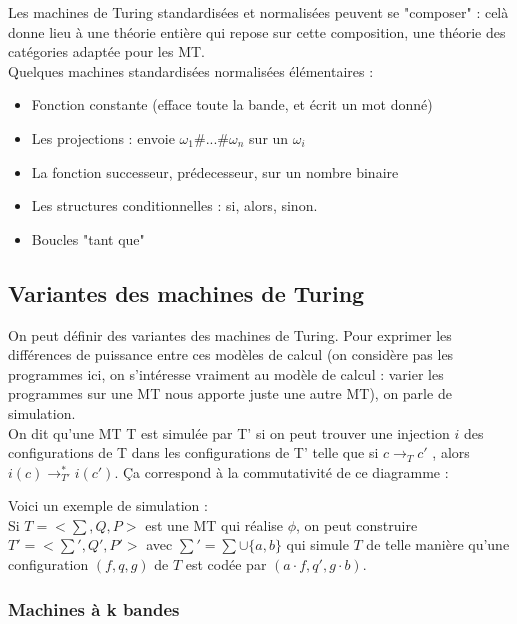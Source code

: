 \documentclass{article}
\begin{document}
Les machines de Turing standardisées et normalisées peuvent se "composer" : celà donne lieu à une théorie entière qui repose sur cette composition, une théorie des catégories adaptée pour les MT. \\ 
Quelques machines standardisées normalisées élémentaires : 
\begin{itemize}
    \item Fonction constante (efface toute la bande, et écrit un mot donné)
    \item Les projections : envoie $\omega_1 \# ... \# \omega_n$ sur un $ \omega_i$ 
    \item La fonction successeur, prédecesseur, sur un nombre binaire
    \item Les structures conditionnelles : si, alors, sinon.
    \item Boucles "tant que"
\end{itemize}

\subsection{Variantes des machines de Turing}

On peut définir des variantes des machines de Turing. Pour exprimer les différences de puissance entre ces modèles de calcul (on considère pas les programmes ici, on s'intéresse vraiment au modèle de calcul : varier les programmes sur une MT nous apporte juste une autre MT), on parle de simulation. \\ 
On dit qu'une MT T est simulée par T' si on peut trouver une injection $i$ des configurations de T dans les configurations de T' telle que si $c \rightarrow_T c'$ , alors $i(c) \rightarrow^*_{T'} i(c')$. Ça correspond à la commutativité de ce diagramme : 

\begin{center}
\end{center}

Voici un exemple de simulation : \\ 
Si $T = <\sum, Q, P>$ est une MT qui réalise $\phi$, on peut construire $T' = <\sum', Q', P'>$ avec $\sum' = \sum \cup \{a,b\}$ qui simule $T$ de telle manière qu'une configuration $(f,q,g)$ de $T$ est codée par $ (a \cdot f, q', g \cdot b)$. 
\subsubsection{Machines à k bandes}
\end{document}
